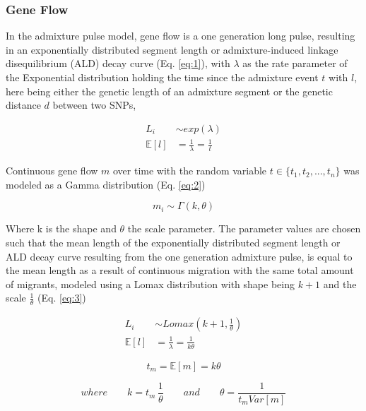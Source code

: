 \documentclass[]{article}
\begin{document}
\subsubsection{Gene Flow}\label{gene flow}

In the admixture pulse model, gene flow is a one generation long pulse,
resulting in an exponentially distributed segment length or admixture-induced linkage
disequilibrium (ALD) decay curve (Eq. \ref{eq:1}), with $\lambda$ as
the rate parameter of the Exponential distribution holding the  time since the admixture event $t$ with $l$, here being either the genetic length of an admixture segment or the genetic
distance \(d\) between two SNPs,

\begin{equation}
\begin{split}
\label{eq:1}
L_i &\sim exp(\lambda) \\
\mathbb{E}[l] &= \frac{1}{\lambda} = \frac{1}{t}
\end{split}
\end{equation}

Continuous gene flow $m$ over time with the random variable $t \in \{t_1,t_2,...,t_n\}$ was modeled as a Gamma distribution (Eq.
\ref{eq:2})

\begin{equation}
\label{eq:2}
m_i \sim \Gamma(k,\theta)
\end{equation}

Where k is the shape and \(\theta\) the scale parameter. The parameter
values are chosen such that the mean length of the
exponentially distributed segment length or ALD decay curve resulting from the one
generation admixture pulse, is equal to the mean length as a result of continuous migration with the same total amount of
migrants, modeled using a Lomax distribution with shape being $k+1$ and the scale $\frac{1}{\theta}$ (Eq. \ref{eq:3})

\begin{equation}
\begin{split}
\label{eq:3}
L_i &\sim Lomax(k+1,\frac{1}{\theta}) \\
\mathbb{E}[l] &= \frac{1}{\lambda} = \frac{1}{k\theta}
\end{split}
\end{equation}

\begin{equation}
\label{eq:4}
t_{m}=\mathbb{E}[m] = k \theta
\end{equation}

\begin{equation*}
\nonumber
where \qquad k=t_m \, \frac{1}{\theta} \qquad and \qquad \theta=\frac{1}{t_{m}Var[m]}
\end{equation*}
\end{document}

